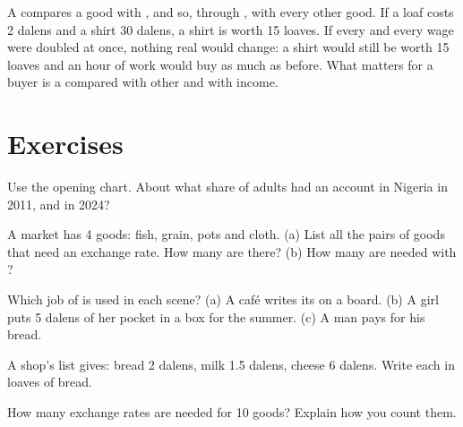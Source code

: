A  compares a good with , and so, through , with every other good. If a
loaf costs 2 dalens and a shirt 30 dalens, a shirt is worth 15 loaves. If every  and
every wage were doubled at once, nothing real would change: a shirt would still be worth
15 loaves and an hour of work would buy as much as before. What matters for a buyer is a
 compared with other  and with income.

\section{Exercises}

\begin{exercise}[$\star$]\label{exo:g7:money:1}
Use the opening chart. About what share of adults had an account in Nigeria in 2011, and
in 2024?
\end{exercise}

\begin{exercise}[$\star$]\label{exo:g7:money:2}
A  market has 4 goods: fish, grain, pots and cloth. (a) List all the pairs of goods
that need an exchange rate. How many are there? (b) How many  are needed with ?
\end{exercise}

\begin{exercise}[$\star$]\label{exo:g7:money:3}
Which job of  is used in each scene? (a) A café writes its  on a board. (b) A
girl puts 5 dalens of her pocket  in a box for the summer. (c) A man pays for his
bread.
\end{exercise}

\begin{exercise}[$\star$]\label{exo:g7:money:4}
A shop's list gives: bread 2 dalens, milk 1.5 dalens, cheese 6 dalens. Write each  in
loaves of bread.
\end{exercise}

\begin{exercise}[$\star\star$]\label{exo:g7:money:5}
How many  exchange rates are needed for 10 goods? Explain how you count them.
\end{exercise}

